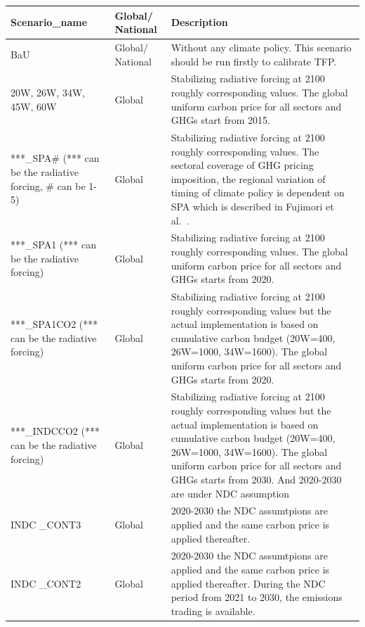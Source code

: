 \documentclass[10pt,a4paper,titlepage,dvipdfmx]{book}
\begin{document}
\begin{tabularx}{\textwidth}{|
p{}|
p{}|
p{}|} 
\caption{\label{tab:CliPolAssList}Climate policy assumptions list} \\
\hline 
Scenario\_name & Global/ National & Description \\\hline 
BaU & Global/ National & Without any climate policy. This scenario should be run firstly to calibrate TFP. \\\hline 
20W, 26W, 34W, 45W, 60W & Global & Stabilizing radiative forcing at 2100 roughly corresponding values. The global uniform carbon price for all sectors and GHGs start from 2015. \\\hline 
***\_SPA\#  \newline (*** can be the radiative forcing, \# can be 1-5) & Global & Stabilizing radiative forcing at 2100 roughly corresponding values. The sectoral coverage of GHG pricing imposition, the regional variation of timing of climate policy is dependent on SPA which is described in Fujimori et al.~\cite{RN4363}. \\\hline 
***\_SPA1  \newline (*** can be the radiative forcing) & Global & Stabilizing radiative forcing at 2100 roughly corresponding values. The global uniform carbon price for all sectors and GHGs starts from 2020. \\\hline 
***\_SPA1CO2 (*** can be the radiative forcing) & Global & Stabilizing radiative forcing at 2100 roughly corresponding values but the actual implementation is based on cumulative carbon budget (20W=400, 26W=1000, 34W=1600). The global uniform carbon price for all sectors and GHGs starts from 2020.  \\\hline 
***\_INDCCO2 (*** can be the radiative forcing) & Global & Stabilizing radiative forcing at 2100 roughly corresponding values but the actual implementation is based on cumulative carbon budget (20W=400, 26W=1000, 34W=1600). The global uniform carbon price for all sectors and GHGs starts from 2030. And 2020-2030 are under NDC assumption \\\hline 
INDC \_CONT3 & Global & 2020-2030 the NDC assumtpions are applied and the same carbon price is applied thereafter. \\\hline 
INDC \_CONT2 & Global & 2020-2030 the NDC assumtpions are applied and the same carbon price is applied thereafter. During the NDC period from 2021 to 2030, the emissions trading is available.~\cite{RN4363} \\\hline 

\end{tabularx}
\end{document}
